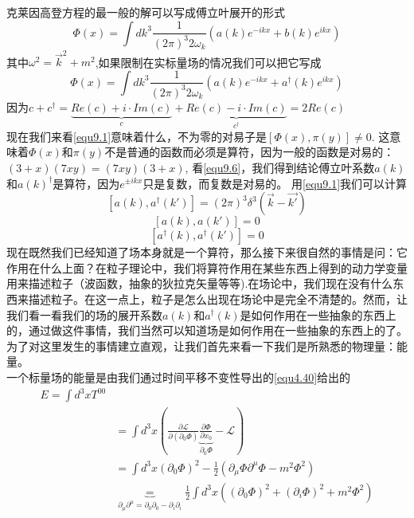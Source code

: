 克莱因高登方程的最一般的解可以写成傅立叶展开的形式
\begin{equation} \label{equ9.5}
\Phi(x)=\int dk^{3}\frac{1}{(2\pi)^{3}2\omega_{k}}(a(k)e^{-ikx}+b(k)e^{ikx})
\end{equation}
其中$\omega^{2}=\vec{k}^{2}+m^{2}$,如果限制在实标量场的情况我们可以把它写成
\begin{equation} \label{equ9.6}
\Phi(x)=\int dk^{3}\frac{1}{(2\pi)^{3}2\omega_{k}}(a(k)e^{-ikx}+a^{\dag}(k)e^{ikx})
\end{equation}
因为$c+c^{\dag}=\underbrace{Re(c)+i \cdot Im(c)}_{c}+\underbrace{Re(c)-i \cdot Im(c)}_{c^{\dag}}=2Re(c)$\\
现在我们来看\ref{equ9.1}意味着什么，不为零的对易子是$[\Phi(x),\pi(y)]\neq 0$. 这意味着$\Phi(x)$和$\pi(y)$不是普通的函数而必须是算符，因为一般的函数是对易的：$(3+x)(7xy)=(7xy)(3+x)$, 看\ref{equ9.6}，我们得到结论傅立叶系数$a(k)$和$a(k)^{\dag}$是算符，因为$e^{\pm ikx}$只是复数，而复数是对易的。
用\ref{equ9.1}我们可以计算
\begin{equation} \label{equ9.7}
[a(k),a^{\dag}(k')]=(2\pi)^{3}\delta^{3}(\vec{k}-\vec{k'})
\end{equation}
\begin{equation} \label{equ9.8}
[a(k),a(k')]=0
\end{equation}
\begin{equation} \label{equ9.9}
[a^{\dag}(k),a^{\dag}(k')]=0
\end{equation}
现在既然我们已经知道了场本身就是一个算符，那么接下来很自然的事情是问：它作用在什么上面？在粒子理论中，我们将算符作用在某些东西上得到的动力学变量用来描述粒子（波函数，抽象的狄拉克矢量等等).在场论中，我们现在没有什么东西来描述粒子。在这一点上，粒子是怎么出现在场论中是完全不清楚的。然而，让我们看一看我们的场的展开系数$a(k)$和$a^{\dag}(k)$是如何作用在一些抽象的东西上的，通过做这件事情，我们当然可以知道场是如何作用在一些抽象的东西上的了。为了对这里发生的事情建立直观，让我们首先来看一下我们是所熟悉的物理量：能量。\\
一个标量场的能量是由我们通过时间平移不变性导出的\ref{equ4.40}给出的
\begin{align} \label{equ9.10}
E=\int d^{3}x T^{00}\\&=\int d^{3}x(\frac{\partial \mathcal{L}}{\partial(\partial_{0}\Phi)}\underbrace{\frac{\partial \Phi}{\partial x_{0}}}_{\partial_{0}\Phi}-\mathcal{L})\\&=\int d^{3}x(\partial_{0}\Phi)^{2}-\frac{1}{2}(\partial_{\mu}\Phi \partial^{\mu}\Phi-m^{2}\Phi^{2})\\ &\underbrace{=}_{\partial_{\mu}\partial^{\mu}=\partial_{0} \partial_{0}-\partial_{i}\partial_{i}}\frac{1}{2}\int d^{3}x( (\partial_{0}\Phi)^{2}+(\partial_{i}\Phi)^{2}+m^{2}\Phi^{2})
\end{align}
